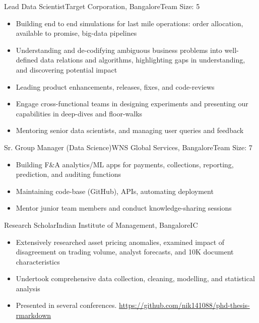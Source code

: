 \documentclass[11pt,a4paper,]{moderncv}
\begin{document}
\nopagebreak
    {Lead Data Scientist}{Target Corporation, Bangalore}{}{Team Size: 5}{
    \begin{itemize}
        \item Building end to end simulations for last mile operations: order allocation, available to promise, big-data pipelines
        \item Understanding and de-codifying ambiguous business problems into well-defined data relations and algorithms, highlighting gaps in understanding, and discovering potential impact
        \item Leading product enhancements, releases, fixes, and code-reviews
        \item Engage cross-functional teams in designing experiments and presenting our capabilities in deep-dives and floor-walks
        \item Mentoring senior data scientists, and managing user queries and feedback
    \end{itemize}
    }
    {Sr. Group Manager (Data Science)}{WNS Global Services, Bangalore}{}{Team Size: 7}{
    \begin{itemize}
        \item Building F\&A analytics/ML apps for payments, collections, reporting, prediction, and auditing functions
        \item Maintaining code-base (GitHub), APIs, automating deployment
        \item Mentor junior team members and conduct knowledge-sharing sessions
    \end{itemize}
    }
    {Research Scholar}{Indian Institute of Management, Bangalore}{}{IC}{
    \begin{itemize}
        \item Extensively researched asset pricing anomalies, examined impact of disagreement on trading volume, analyst forecasts, and 10K document characteristics
        \item Undertook comprehensive data collection, cleaning, modelling, and statistical analysis
        \item Presented in several conferences. \url{https://github.com/nik141088/phd-thesis-rmarkdown}
    \end{itemize}
    }
\end{document}
